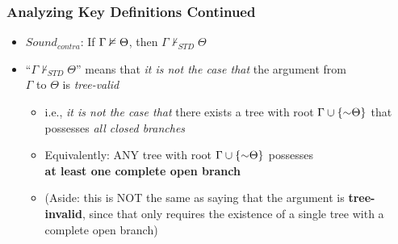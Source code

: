 \begin{frame}
\frametitle{Analyzing Key Definitions Continued}

\begin{itemize}[<+->]

\item \emph{$Sound_{contra}$}: If $\Gamma \nvDash \Theta$, then $\Gamma \nvdash_{STD} \Theta$ 

\item ``$\Gamma \nvdash_{STD} \Theta$'' means that \textit{it is not the case that} the argument from \\ $\Gamma$ to $\Theta$ is  \emph{tree-valid}


\bigskip

\begin{itemize}

\item i.e., \textit{it is not the case that} there exists a tree with root $\Gamma \cup \{\enot \Theta \}$ that possesses \emph{all closed branches}

\item \textcolor{OGlyallpink}{Equivalently}: ANY tree with root $\Gamma \cup \{\enot \Theta \}$ possesses \\   \textbf{at least one \textcolor{OGlyallpink}{complete open branch}}

\item (Aside: this is NOT the same as saying that the argument is \textcolor{OGlyallpink}{\textbf{tree-invalid}}, since that only requires the existence of a single tree with a complete open branch) 



\end{itemize}

\end{itemize}
\end{frame}

